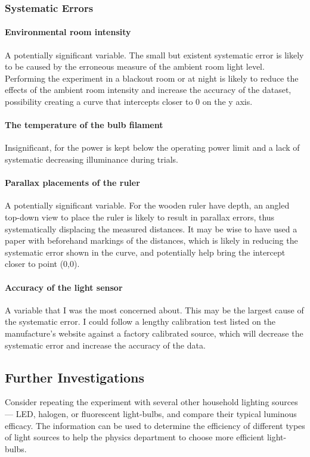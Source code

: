 \documentclass[a4paper,12pt]{article}
\begin{document}
\subsubsection{Systematic Errors}
\paragraph{Environmental room intensity}
A potentially significant variable. The small but existent systematic error is likely to be caused by the erroneous measure of the ambient room light level. Performing the experiment in a blackout room or at night is likely to reduce the effects of the ambient room intensity and increase the accuracy of the dataset, possibility creating a curve that intercepts closer to 0 on the y axis.

\paragraph{The temperature of the bulb filament}
Insignificant, for the power is kept below the operating power limit and a lack of systematic decreasing illuminance during trials.

\paragraph{Parallax placements of the ruler}
A potentially significant variable. For the wooden ruler have depth, an angled top-down view to place the ruler is likely to result in parallax errors, thus systematically displacing the measured distances. It may be wise to have used a paper with beforehand markings of the distances, which is likely in reducing the systematic error shown in the curve, and potentially help bring the intercept closer to point (0,0).

\paragraph{Accuracy of the light sensor}
A variable that I was the most concerned about. This may be the largest cause of the systematic error. I could follow a lengthy calibration test listed on the manufacture's website against a factory calibrated source, which will decrease the systematic error and increase the accuracy of the data.

\subsection{Further Investigations}
Consider repeating the experiment with several other household lighting sources --- LED, halogen, or fluorescent light-bulbs, and compare their typical luminous efficacy. The information can be used to determine the efficiency of different types of light sources to help the physics department to choose more efficient light-bulbs.

\newpage
\printbibliography
\end{document}
